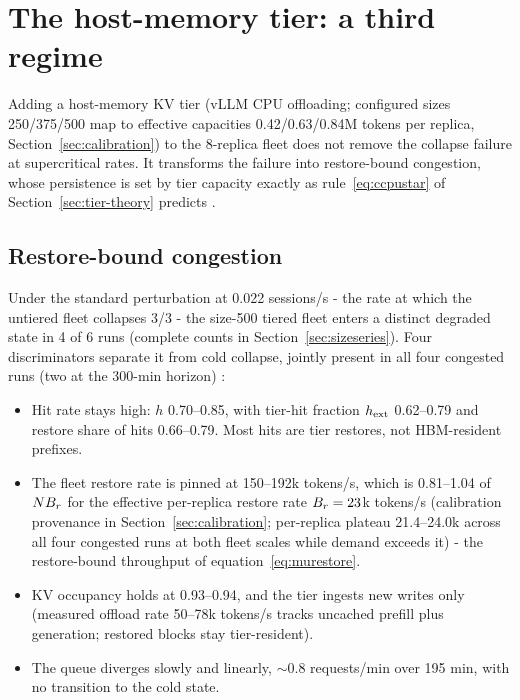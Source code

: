 \section{The host-memory tier: a third regime}
\label{sec:tier}

Adding a host-memory KV tier (vLLM CPU offloading; configured sizes
250/375/500 map to effective capacities 0.42/0.63/0.84M tokens per
replica, Section~\ref{sec:calibration}) to the 8-replica fleet does not remove the
collapse failure at supercritical rates. It transforms the failure
into restore-bound congestion, whose persistence is set by tier
capacity exactly as rule~\eqref{eq:ccpustar} of Section~\ref{sec:tier-theory} predicts .

\subsection{Restore-bound congestion}
\label{sec:congestion}

Under the standard perturbation at 0.022 sessions/s - the rate at
which the untiered fleet collapses 3/3 - the size-500 tiered fleet
enters a distinct degraded state in 4 of 6 runs (complete counts in
Section~\ref{sec:sizeseries}). Four discriminators separate it from cold collapse,
jointly present in all four congested runs (two at the 300-min
horizon) :

\begin{itemize}
\item Hit rate stays high: $h$ 0.70--0.85, with tier-hit fraction $h_{\mathrm{ext}}$
  0.62--0.79 and restore share of hits 0.66--0.79. Most hits are tier
  restores, not HBM-resident prefixes.
\item The fleet restore rate is pinned at 150--192k tokens/s, which is
  0.81--1.04 of $N B_r$ for the effective per-replica restore rate
  $B_r = 23$k tokens/s (calibration provenance in Section~\ref{sec:calibration};
  per-replica plateau 21.4--24.0k across all four congested runs at
  both fleet scales while demand exceeds it) - the restore-bound
  throughput of equation~\eqref{eq:murestore}.
\item KV occupancy holds at 0.93--0.94, and the tier ingests new writes
  only (measured offload rate 50--78k tokens/s tracks uncached
  prefill plus generation; restored blocks stay tier-resident).
\item The queue diverges slowly and linearly, $\sim$0.8 requests/min over 195
  min, with no transition to the cold state.
\end{itemize}

